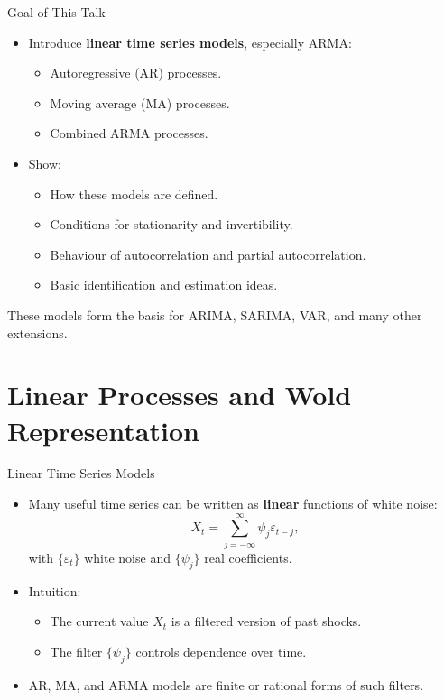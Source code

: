\documentclass{beamer}
\begin{document}
\begin{frame}{Goal of This Talk}
  \begin{itemize}
    \item Introduce \textbf{linear time series models}, especially ARMA:
      \begin{itemize}
        \item Autoregressive (AR) processes.
        \item Moving average (MA) processes.
        \item Combined ARMA processes.
      \end{itemize}
    \item Show:
      \begin{itemize}
        \item How these models are defined.
        \item Conditions for stationarity and invertibility.
        \item Behaviour of autocorrelation and partial autocorrelation.
        \item Basic identification and estimation ideas.
      \end{itemize}
  \end{itemize}

  \vspace{0.3cm}
  These models form the basis for ARIMA, SARIMA, VAR, and many other extensions.
\end{frame}

\section{Linear Processes and Wold Representation}

\begin{frame}{Linear Time Series Models}
  \begin{itemize}
    \item Many useful time series can be written as \textbf{linear} functions of white noise:
      \[
        X_t = \sum_{j=-\infty}^{\infty} \psi_j \varepsilon_{t-j},
      \]
      with $\{\varepsilon_t\}$ white noise and $\{\psi_j\}$ real coefficients.
    \item Intuition:
      \begin{itemize}
        \item The current value $X_t$ is a filtered version of past shocks.
        \item The filter $\{\psi_j\}$ controls dependence over time.
      \end{itemize}
    \item AR, MA, and ARMA models are finite or rational forms of such filters.
  \end{itemize}
\end{frame}
\end{document}
